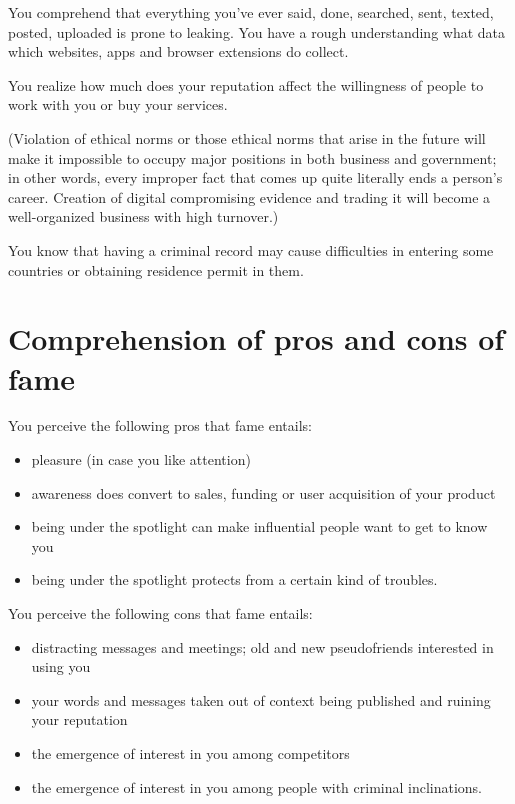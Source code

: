 \documentclass[11pt]{article}
\theoremstyle{remark}
\theoremstyle{definition}
\begin{document}
You comprehend that everything you've ever said, done, searched, sent, texted, posted, uploaded is prone to leaking. You have a rough understanding what data which websites, apps and browser extensions do collect. 

You realize how much does your reputation affect the willingness of people to work with you or buy your services.

(Violation of ethical norms or those ethical norms that arise in the future will make it impossible to occupy major positions in both business and government; in other words, every improper fact that comes up quite literally ends a person's career. Creation of digital compromising evidence and trading it will become a well-organized business with high turnover.)

You know that having a criminal record may cause difficulties in entering some countries or obtaining residence permit in them.





\section{Comprehension of pros and cons of fame}





You perceive the following pros that fame entails:

\begin{itemize}
\item pleasure (in case you like attention)
\item awareness does convert to sales, funding or user acquisition of your product
\item being under the spotlight can make influential people want to get to know you
\item being under the spotlight protects from a certain kind of troubles.
\end{itemize}




You perceive the following cons that fame entails: 

\begin{itemize}
\item distracting messages and meetings; old and new pseudofriends interested in using you
\item your words and messages taken out of context being published and ruining your reputation
\item the emergence of interest in you among competitors 
\item the emergence of interest in you among people with criminal inclinations.
\end{itemize}
\end{document}
